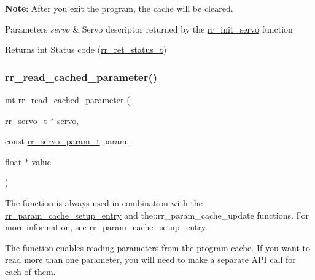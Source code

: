 {\bfseries Note}\+: After you exit the program, the cache will be cleared.


\begin{DoxyParams}{Parameters}
{\em servo} & Servo descriptor returned by the \hyperlink{group___init_ga0adb313a3eeb8a4399431e940a1f3e9e}{rr\+\_\+init\+\_\+servo} function \\
\hline
\end{DoxyParams}
\begin{DoxyReturn}{Returns}
int Status code (\hyperlink{api_8h_a92d5be5038abcf89837faf85a08debdc}{rr\+\_\+ret\+\_\+status\+\_\+t}) 
\end{DoxyReturn}
\mbox{\label{group___realtime_ga9249202a29031f84b7dc3da37db05dfc}} 
\subsubsection{\texorpdfstring{rr\+\_\+read\+\_\+cached\+\_\+parameter()}{rr\_read\_cached\_parameter()}}
{\footnotesize\ttfamily int rr\+\_\+read\+\_\+cached\+\_\+parameter (\begin{DoxyParamCaption}\item[{\hyperlink{structrr__servo__t}{rr\+\_\+servo\+\_\+t} $\ast$}]{servo,  }\item[{const \hyperlink{api_8h_aa1f58887fab4642cf49f6f453c1d276d}{rr\+\_\+servo\+\_\+param\+\_\+t}}]{param,  }\item[{float $\ast$}]{value }\end{DoxyParamCaption})}



The function is always used in combination with the \hyperlink{group___realtime_ga770c1e8b4d868cea649592e26a2706dd}{rr\+\_\+param\+\_\+cache\+\_\+setup\+\_\+entry} and the\+::rr\+\_\+param\+\_\+cache\+\_\+update functions. For more information, see \hyperlink{group___realtime_ga770c1e8b4d868cea649592e26a2706dd}{rr\+\_\+param\+\_\+cache\+\_\+setup\+\_\+entry}. 

The function enables reading parameters from the program cache. If you want to read more than one parameter, you will need to make a separate A\+PI call for each of them.

